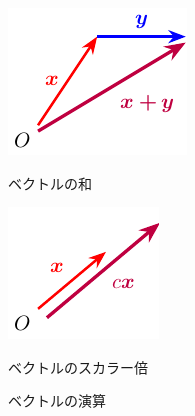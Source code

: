 \documentclass[../sotsu.tex]{subfiles}
\begin{document}
\begin{figure}[tbp]
    \centering
    \begin{subcaptionblock}{0.4\linewidth}
        \centering
        \includegraphics[width=0.9\linewidth]{vector_sum.pdf}
        \caption{ベクトルの和}
        \label{fig:vector-sum}
    \end{subcaptionblock}
    \begin{subcaptionblock}{0.4\linewidth}
        \centering
        \includegraphics[width=0.9\linewidth]{vector_scalar_p.pdf}
        \caption{ベクトルのスカラー倍}
        \label{fig:vector-scalar-p}
    \end{subcaptionblock}
    \caption{ベクトルの演算}
\end{figure}
\end{document}
